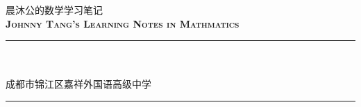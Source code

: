 
\begin{titlepage}
    \colorbox{black!5}{
        \parbox[t]{0.975\textwidth}{%
            \parbox[t]{0.95\textwidth}{%
                \raggedleft\vspace{0.75cm}\Huge\scshape
                晨沐公的数学学习笔记 \\[7.5pt]
                \large\bf Johnny Tang's Learning Notes in Mathmatics
                \vspace{0.75cm}
            }
        }
    }

    \vfill

    \parbox[t]{0.95\textwidth}{%
        \hfill\rule{0.15\linewidth}{0.5pt}\\[7.5pt]
        \raggedleft
        \textcopyright{}\\[4pt]
        
        \normalsize\textsuperscript{\textdagger} 成都市锦江区嘉祥外国语高级中学\\

        \hfill\rule{0.15\linewidth}{0.5pt}
    }
\end{titlepage}
